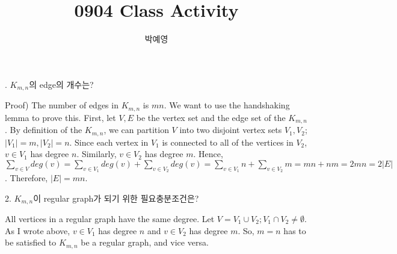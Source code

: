 \documentclass[a4paper, 12pt]{article}
\title{0904 Class Activity}
\author{박예영}
\begin{document}
. $K_{m,n}$의 edge의 개수는?

\doublespacing

Proof)
The number of edges in $K_{m, n}$ is $mn$.
We want to use the handshaking lemma to prove this.
First, let $V, E$ be the vertex set and the edge set of the $K_{m, n}$. By definition of the $K_{m, n}$, we can partition $V$ into two disjoint vertex sets $V_1, V_2$; $|V_1| = m, |V_2| = n$.
Since each vertex in $V_1$ is connected to all of the vertices in $V_2$,  $v \in V_1$ has degree $n$. Similarly, $v \in V_2$ has degree $m$.
Hence, $\sum_{v \in V} deg(v) = \sum_{v \in V_1} deg(v) + \sum_{v \in V_2} deg(v) = \sum_{v \in V_1} n + \sum_{v \in V_2} m = mn + nm = 2mn = 2|E|$.
Therefore, $|E| = mn$.

\doublespacing

2. $K_{m,n}$이 regular graph가 되기 위한 필요충분조건은?

All vertices in a regular graph have the same degree.
Let $V = V_1 \cup V_2; V_1 \cap V_2 \neq \emptyset $. As I wrote above, $v \in V_1$ has degree $n$ and $v \in V_2$ has degree $m$.
So, $m = n$ has to be satisfied to $K_{m, n}$ be a regular graph, and vice versa.
\end{document}
